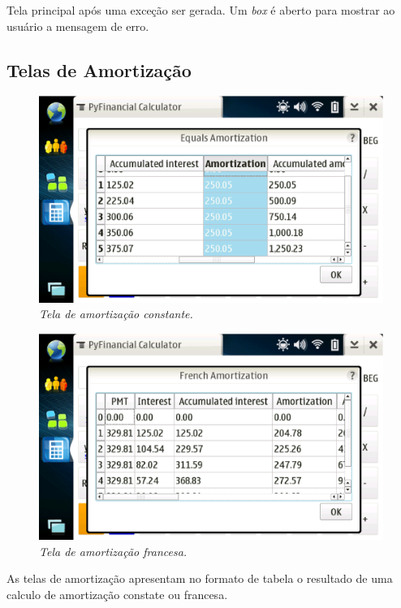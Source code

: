 Tela principal após uma exceção ser gerada. Um \textit{box} é aberto para mostrar ao usuário a
mensagem de erro.


\subsection{Telas de Amortização}

\begin{figure}[!h]
 \includegraphics[scale=0.6]{tela_cas.eps}
 \caption{\it Tela de amortização constante.} \label{tab:tela_cas}
\end{figure}

\begin{figure}[!h]
 \includegraphics[scale=0.6]{tela_fas.eps}
 \caption{\it Tela de amortização francesa.} \label{tab:tela_fas}
\end{figure}


As telas de amortização apresentam no formato de tabela o resultado de uma calculo de
amortização constate ou francesa.


